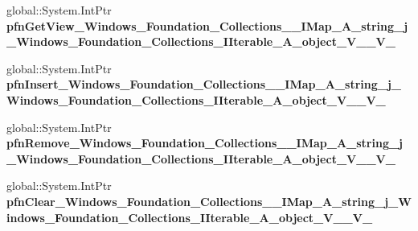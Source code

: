 \begin{DoxyCompactItemize}
global\+::\+System.\+Int\+Ptr {\bfseries pfn\+Get\+View\+\_\+\+Windows\+\_\+\+Foundation\+\_\+\+Collections\+\_\+\+\_\+\+I\+Map\+\_\+\+A\+\_\+string\+\_\+j\+\_\+\+Windows\+\_\+\+Foundation\+\_\+\+Collections\+\_\+\+I\+Iterable\+\_\+\+A\+\_\+object\+\_\+\+V\+\_\+\+\_\+\+V\+\_\+}
\item 
\mbox{\label{struct_system_1_1_collections_1_1_generic_1_1_i_dictionary___a__string__j___system___collectionsedc27740e4e948ffc8828d48179ed85a_a87baa7753dea1aa6ca9cd880e187cc74}} 
global\+::\+System.\+Int\+Ptr {\bfseries pfn\+Insert\+\_\+\+Windows\+\_\+\+Foundation\+\_\+\+Collections\+\_\+\+\_\+\+I\+Map\+\_\+\+A\+\_\+string\+\_\+j\+\_\+\+Windows\+\_\+\+Foundation\+\_\+\+Collections\+\_\+\+I\+Iterable\+\_\+\+A\+\_\+object\+\_\+\+V\+\_\+\+\_\+\+V\+\_\+}
\item 
\mbox{\label{struct_system_1_1_collections_1_1_generic_1_1_i_dictionary___a__string__j___system___collectionsedc27740e4e948ffc8828d48179ed85a_ac2737fb42f4c1a9ce78b28cf842be779}} 
global\+::\+System.\+Int\+Ptr {\bfseries pfn\+Remove\+\_\+\+Windows\+\_\+\+Foundation\+\_\+\+Collections\+\_\+\+\_\+\+I\+Map\+\_\+\+A\+\_\+string\+\_\+j\+\_\+\+Windows\+\_\+\+Foundation\+\_\+\+Collections\+\_\+\+I\+Iterable\+\_\+\+A\+\_\+object\+\_\+\+V\+\_\+\+\_\+\+V\+\_\+}
\item 
\mbox{\label{struct_system_1_1_collections_1_1_generic_1_1_i_dictionary___a__string__j___system___collectionsedc27740e4e948ffc8828d48179ed85a_af8683dc85d1469ce9563e561b2cfd7ba}} 
global\+::\+System.\+Int\+Ptr {\bfseries pfn\+Clear\+\_\+\+Windows\+\_\+\+Foundation\+\_\+\+Collections\+\_\+\+\_\+\+I\+Map\+\_\+\+A\+\_\+string\+\_\+j\+\_\+\+Windows\+\_\+\+Foundation\+\_\+\+Collections\+\_\+\+I\+Iterable\+\_\+\+A\+\_\+object\+\_\+\+V\+\_\+\+\_\+\+V\+\_\+}
\end{DoxyCompactItemize}
